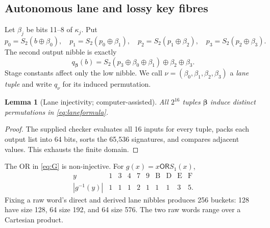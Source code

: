 \documentclass[10pt]{article}
\theoremstyle{plain}
\newtheorem{lemma}[theorem]{Lemma}
\theoremstyle{definition}
\theoremstyle{remark}
\newcommand{\xor}{\mathbin{\oplus}}
\newcommand{\OR}{\mathbin{\mathsf{OR}}}
\begin{document}
\subsection{Autonomous lane and lossy key fibres}
\label{sec:fibres}

Let \(\beta_j\) be bits 11--8 of \(\kappa_j\).  Put
\[
p_0=S_2(b\xor\beta_0),\quad p_1=S_2(p_0\xor\beta_1),\quad
p_2=S_2(p_1\xor\beta_2),\quad p_3=S_2(p_2\xor\beta_3).
\]
The second output nibble is exactly
\begin{equation}
q_{\boldsymbol\beta}(b)=
S_2(p_3\xor\beta_0\xor\beta_1)\xor\beta_2\xor\beta_3.
\label{eq:laneformula}
\end{equation}
Stage constants affect only the low nibble.  We call
\(\nu=(\beta_0,\beta_1,\beta_2,\beta_3)\) a \emph{lane tuple} and write
\(q_\nu\) for its induced permutation.

\begin{lemma}[Lane injectivity; computer-assisted]
\label{lem:laneinjective}
All \(2^{16}\) tuples \(\boldsymbol\beta\) induce distinct permutations in
\eqref{eq:laneformula}.
\end{lemma}
\begin{proof}
The supplied checker evaluates all 16 inputs for every tuple, packs each
output list into 64 bits, sorts the 65,536 signatures, and compares adjacent
values.  This exhausts the finite domain.
\end{proof}

The OR in \eqref{eq:G} is non-injective.  For
\(g(x)=x\OR S_1(x)\),
\[
\begin{array}{c|ccccccccc}
y&1&3&4&7&9&\mathrm B&\mathrm D&\mathrm E&\mathrm F\\ \hline
|g^{-1}(y)|&1&1&1&2&1&1&1&3&5.
\end{array}
\]
Fixing a raw word's direct and derived lane nibbles produces 256 buckets:
128 have size 128, 64 size 192, and 64 size 576.  The two raw words range over
a Cartesian product.
\end{document}
